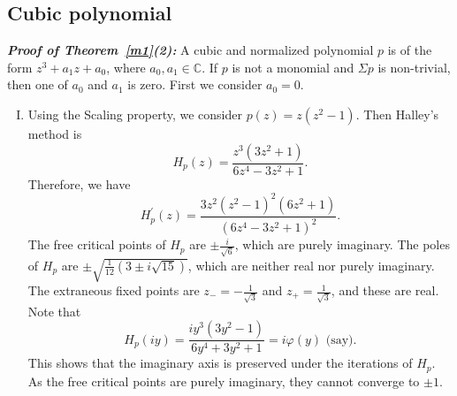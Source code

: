 \documentclass[12pt]{article}
\begin{document}
\subsection{Cubic polynomial}
\textbf{\textit{Proof of Theorem~\ref{m1}(2):}} A cubic and normalized polynomial $p$ is of the form $z^3+a_1z+a_0$, where $a_0,a_1 \in \mathbb{C}$. If $p$ is not a monomial and $\Sigma p$ is non-trivial, then one of $a_0$ and $a_1$ is zero. First we consider $a_0=0$.
\begin{enumerate}[(I)]
\item Using the Scaling property, we consider $p(z)=z\left(z^{2}-1\right)$. Then Halley's method is
\begin{equation}\label{H_1n2}
H_{p}(z)=\frac{z^{3}\left(3 z^{2}+1\right)}{6 z^{4}-3 z^{2}+1} .
\end{equation}
Therefore, we have $$H_{p}^{\prime}(z)=\frac{3 z^{2}\left(z^{2}-1\right)^{2}\left(6 z^{2}+1\right)}{\left(6 z^{4}-3 z^{2}+1\right)^{2}}.$$
The free critical points of $H_p$ are $ \pm \frac{i}{\sqrt{6}}$, which are purely imaginary.
The poles of $H_p$ are $ \pm \sqrt{\frac{1}{12}(3 \pm i \sqrt{15})}$, which are neither real nor purely imaginary. The extraneous fixed points are $z_{-}=- \frac{1}{\sqrt{3}}$ and $z_{+}=\frac{1}{\sqrt{3}}$, and these are real.
Note that
\begin{equation}\label{phi_1n2}
H_{p}(i y)=\frac{i y^{3}\left(3 y^{2}-1\right)}{6 y^{4}+3 y^{2}+1}
=i\varphi(y) \text{ (say).}
\end{equation}
This shows that the imaginary axis is preserved under the iterations of $H_{p}$. As the free critical points are purely imaginary, they cannot converge to $\pm 1$.


\end{enumerate}
\end{document}

